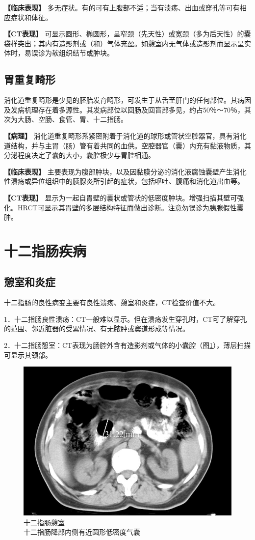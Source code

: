 \textbf{【临床表现】}
多无症状。有的可有上腹部不适；当有溃疡、出血或穿孔等可有相应症状和体征。

\textbf{【CT表现】}
可显示圆形、椭圆形，呈窄颈（先天性）或宽颈（多为后天性）的囊袋样突出；其内有造影剂或（和）气体充盈。如憩室内无气体或造影剂而显示呈实体时，易误诊为软组织结节或肿块。

\subsection{胃重复畸形}

消化道重复畸形是少见的胚胎发育畸形，可发生于从舌至肝门的任何部位。其病因及发病机理存在着多源性。其发病部位以回肠及回盲部多见，约占50％～70％，其次为大肠、空肠、食管、胃、十二指肠。

\textbf{【病理】}
消化道重复畸形系紧密附着于消化道的球形或管状空腔器官，具有消化道结构，并与主胃（肠）管有着共同的血供。空腔器官（囊）内充有黏液物质，其分泌程度决定了囊的大小，囊腔极少与胃腔相通。

\textbf{【临床表现】}
主要表现为腹部肿块，以及因黏膜分泌的消化液腐蚀囊壁产生消化性溃疡或异位组织中的胰腺炎所引起的症状，包括呕吐、腹痛和消化道出血等。

\textbf{【CT表现】}
显示为一起自胃壁的囊状或管状的低密度肿块。增强扫描其壁可强化。HRCT可显示其胃壁的多层结构特征而做出诊断。注意勿误诊为胰腺假性囊肿。

\section{十二指肠疾病}

\subsection{憩室和炎症}

十二指肠的良性病变主要有良性溃疡、憩室和炎症，CT检查价值不大。

1．十二指肠良性溃疡：CT一般难以显示。但在溃疡发生穿孔时，CT可了解穿孔的范围、邻近脏器的受累情况、有无脓肿或窦道形成等情况。

2．十二指肠憩室：CT表现为肠腔外含有造影剂或气体的小囊腔（图\ref{fig17-10}），薄层扫描可显示其颈部。

\begin{figure}[!htbp]
 \centering
 \includegraphics[width=.7\textwidth,height=\textheight,keepaspectratio]{./images/Image00361.jpg}
 \captionsetup{justification=centering}
 \caption{十二指肠憩室\\{\small 十二指肠降部内侧有近圆形低密度气囊}}
 \label{fig17-10}
  \end{figure} 

